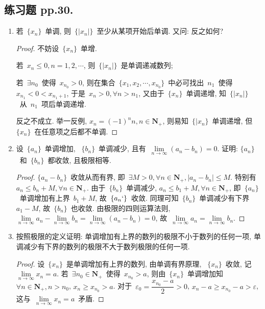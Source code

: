 \documentclass[UTF8,a4paper,11pt,twoside]{book}
\begin{document}
\subsection{练习题 pp.30.}
\begin{enumerate}
	\item 若~$\{x_n\}$~单调, 则~$\{|x_n|\}$~至少从某项开始后单调. 又问: 反之如何?
	      \begin{proof}
		      不妨设~$\{x_n\}$~单增.

		      若~$x_n\leqslant 0, n=1,2,\cdots$, 则~$\{|x_n|\}$~是单调递减数列;

		      若~$\exists n_0$~使得~$x_{n_0}>0$, 则在集合~$\{x_1, x_2,\cdots,x_{n_0}\}$~中必可找出~$n_1$~使得~$x_{n_1}<0<x_{n_1+1}$, 于是~$x_n>0, \forall n>n_1$, 又由于~$\{x_n\}$~单调递增, 知~$\{|x_n|\}$~从~$n_1$~项后单调递增.

		      反之不成立. 举一反例, $x_n=(-1)^nn, n\in\mathbf{N}_{+}$, 则易知~$\{|x_n\}$~单调递增, 但~$\{x_n\}$~在任意项之后都不单调.\qedhere
	      \end{proof}
	\item 设~$\{a_n\}$~单调增加, ~$\{b_n\}$~单调减少, 且有~$\lim\limits_{n\to\infty} (a_n-b_n)=0$. 证明: $\{a_n\}$~和~$\{b_n\}$~都收敛, 且极限相等.
	      \begin{proof}
		      $\{a_n-b_n\}$~收敛从而有界, 即~$\exists M>0, \forall n\in\mathbf{N}_{+}, |a_n-b_n|\leqslant M$. 特别有~$a_n\leqslant b_n+M, \forall n\in\mathbf{N}_{+}$. 由于~$\{b_n\}$~单调减少, $a_n\leqslant b_1+M, \forall n\in\mathbf{N}_{+}$, 即~$\{a_n\}$~单调增加有上界~$b_1+M$, 故~$\{a_n`\}$~收敛. 同理可知~$\{b_n\}$~单调减少有下界~$a_1-M$, 故~$\{b_n\}$~也收敛. 由极限的四则运算法则, $\lim\limits_{n\to\infty} a_n-\lim\limits_{n\to\infty} b_n=\lim\limits_{n\to\infty} (a_n-b_n)=0$, 故~$\lim\limits_{n\to\infty} a_n=\lim\limits_{n\to\infty} b_n$.\qedhere
	      \end{proof}
	\item 按照极限的定义证明: 单调增加有上界的数列的极限不小于数列的任何一项, 单调减少有下界的数列的极限不大于数列极限的任何一项.
	      \begin{proof}
		      设~$\{x_n\}$~是单调增加有上界的数列, 由单调有界原理, ~$\{x_n\}$~收敛, 记~$\lim\limits_{n\to\infty} x_n=a$. 若~$\exists n_0\in\mathbf{N}_{+}$~使得~$x_{n_0}>a$, 则由~$\{x_n\}$~单调增加知~$\forall n\in\mathbf{N}_{+}, n>n_0$, $x_n\geqslant x_{n_0}>a$. 对于~$\varepsilon_0=\dfrac{x_{n_0}-a}{2}>0$, $x_n-a\geqslant x_{n_0}-a>\varepsilon$, 这与~$\lim\limits_{n\to\infty} x_n=a$~矛盾.


\end{proof}
\end{enumerate}
\end{document}
